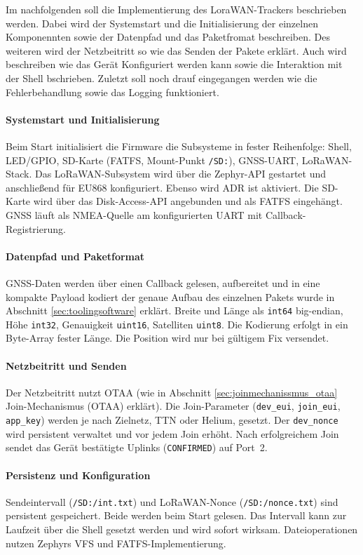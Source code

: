 Im nachfolgenden soll die Implementierung des LoraWAN-Trackers beschrieben werden. Dabei wird der Systemstart und die Initialisierung der einzelnen Komponennten sowie der Datenpfad und das Paketfromat beschreiben. Des weiteren wird der Netzbeitritt so wie das Senden der Pakete erklärt. Auch wird beschreiben wie das Gerät Konfiguriert werden kann sowie die Interaktion mit der Shell bschrieben. Zuletzt soll noch drauf eingegangen werden wie die Fehlerbehandlung sowie das Logging funktioniert.

\paragraph*{Systemstart und Initialisierung}
Beim Start initialisiert die Firmware die Subsysteme in fester Reihenfolge: Shell, LED/GPIO, SD-Karte (FATFS, Mount-Punkt \texttt{/SD:}), GNSS-UART, LoRaWAN-Stack. Das LoRaWAN-Subsystem wird über die Zephyr-API gestartet und anschließend für EU868 konfiguriert. Ebenso wird ADR ist aktiviert. Die SD-Karte wird über das Disk-Access-API angebunden und als FATFS eingehängt. GNSS läuft als NMEA-Quelle am konfigurierten UART mit Callback-Registrierung.

\paragraph*{Datenpfad und Paketformat}
GNSS-Daten werden über einen Callback gelesen, aufbereitet und in eine kompakte Payload kodiert der genaue Aufbau des einzelnen Pakets wurde in Abschnitt \ref{sec:toolingsoftware} erklärt. Breite und Länge als \texttt{int64} big-endian, Höhe \texttt{int32}, Genauigkeit \texttt{uint16}, Satelliten \texttt{uint8}. Die Kodierung erfolgt in ein Byte-Array fester Länge. Die Position wird nur bei gültigem Fix versendet.

\paragraph*{Netzbeitritt und Senden}
Der Netzbeitritt nutzt OTAA (wie in Abschnitt \ref{sec:joinmechanissmus_otaa} Join-Mechanismus (OTAA)  erklärt). Die Join-Parameter (\texttt{dev\_eui}, \texttt{join\_eui}, \texttt{app\_key}) werden je nach Zielnetz, TTN oder Helium, gesetzt. Der \texttt{dev\_nonce} wird persistent verwaltet und vor jedem Join erhöht. Nach erfolgreichem Join sendet das Gerät bestätigte Uplinks (\texttt{CONFIRMED}) auf Port~2.

\paragraph*{Persistenz und Konfiguration}
Sendeintervall (\texttt{/SD:/int.txt}) und LoRaWAN-Nonce (\texttt{/SD:/nonce.txt}) sind persistent gespeichert. Beide werden beim Start gelesen. Das Intervall kann zur Laufzeit über die Shell gesetzt werden und wird sofort wirksam. Dateioperationen nutzen Zephyrs VFS und FATFS-Implementierung.

